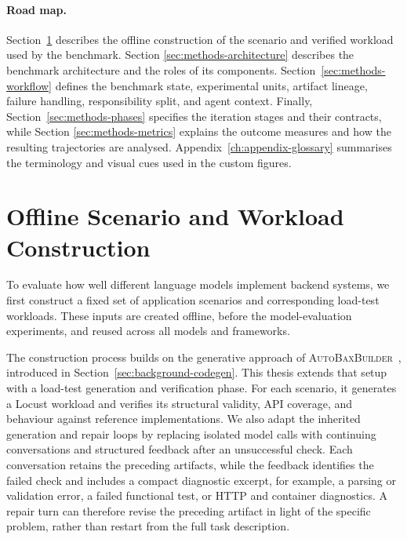 \paragraph{Road map.}
Section~\ref{sec:methods-scenario-gen} describes the offline construction of
the scenario and verified workload used by the benchmark. Section
\ref{sec:methods-architecture} describes the benchmark architecture and the
roles of its components. Section~\ref{sec:methods-workflow} defines the
benchmark state, experimental units, artifact lineage, failure handling,
responsibility split, and agent context. Finally, Section~\ref{sec:methods-phases}
specifies the iteration stages and their contracts, while Section
\ref{sec:methods-metrics} explains the outcome measures and how the resulting
trajectories are analysed. Appendix~\ref{ch:appendix-glossary} summarises the
terminology and visual cues used in the custom figures.


\newpage
\section{Offline Scenario and Workload Construction}
\label{sec:methods-scenario-gen}

To evaluate how well different language models implement backend systems, we
first construct a fixed set of application scenarios and corresponding
load-test workloads. These inputs are created offline, before the
model-evaluation experiments, and reused across all models and frameworks.

The construction process builds on the generative approach of
\textsc{AutoBaxBuilder}~\cite{vonarx2025autobaxbuilder}, introduced in
Section~\ref{sec:background-codegen}. This thesis extends that setup with a
load-test generation and verification phase. For each scenario, it generates
a Locust workload and verifies its structural validity, API coverage, and
behaviour against reference implementations. We also adapt the inherited
generation and repair loops by replacing isolated model calls with continuing
conversations and structured feedback after an unsuccessful check. Each
conversation retains the preceding artifacts, while the feedback identifies
the failed check and includes a compact diagnostic excerpt, for example, a
parsing or validation error, a failed functional test, or HTTP and container
diagnostics. A repair turn can therefore revise the preceding artifact in
light of the specific problem, rather than restart from the full task
description.

